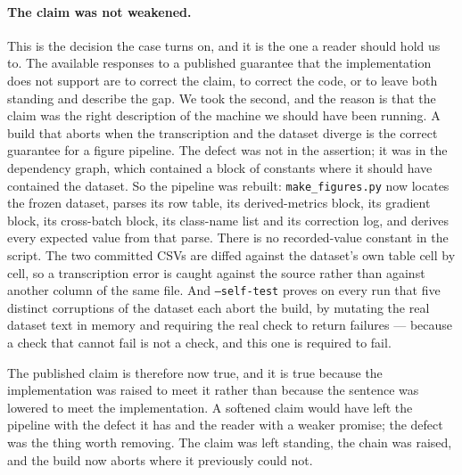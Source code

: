 \documentclass[sigconf,review]{acmart}
\begin{document}
\paragraph{The claim was not weakened.} This is the decision the case turns on,
and it is the one a reader should hold us to. The available responses to a
published guarantee that the implementation does not support are to correct the
claim, to correct the code, or to leave both standing and describe the gap. We
took the second, and the reason is that the claim was the right description of
the machine we should have been running. A build that aborts when the
transcription and the dataset diverge is the correct guarantee for a figure
pipeline. The defect was not in the assertion; it was in the dependency graph,
which contained a block of constants where it should have contained the
dataset. So the pipeline was rebuilt: \texttt{make\_figures.py} now locates the
frozen dataset, parses its row table, its derived-metrics block, its gradient
block, its cross-batch block, its class-name list and its correction log, and
derives every expected value from that parse. There is no recorded-value
constant in the script. The two committed CSVs are diffed against the dataset's
own table cell by cell, so a transcription error is caught against the source
rather than against another column of the same file. And
\texttt{--self-test} proves on every run that five distinct corruptions of the
dataset each abort the build, by mutating the real dataset text in memory and
requiring the real check to return failures --- because a check that cannot
fail is not a check, and this one is required to fail.

The published claim is therefore now true, and it is true because the
implementation was raised to meet it rather than because the sentence was
lowered to meet the implementation. A softened claim would have left the
pipeline with the defect it has and the reader with a weaker promise; the
defect was the thing worth removing. The claim was left standing, the chain
was raised, and the build now aborts where it previously could not.
\end{document}
